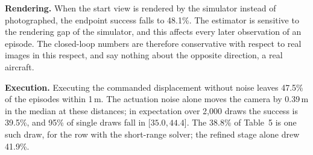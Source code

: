 \documentclass[10pt,twocolumn,letterpaper]{article}
\newcommand{\ci}[2]{{\scriptsize[\ensuremath{#1},\,\ensuremath{#2}]}}
\begin{document}
\noindent\textbf{Rendering.} When the start view is rendered by the simulator instead of photographed, the endpoint success falls to 48.1\%. The estimator is sensitive to the rendering gap of the simulator, and this affects every later observation of an episode. The closed-loop numbers are therefore conservative with respect to real images in this respect, and say nothing about the opposite direction, a real aircraft.

\noindent\textbf{Execution.} Executing the commanded displacement without noise leaves 47.5\% of the episodes within 1\,m. The actuation noise alone moves the camera by 0.39\,m in the median at these distances; in expectation over 2{,}000 draws the success is 39.5\%, and 95\% of single draws fall in \ci{35.0}{44.4}. The 38.8\% of Table~5 is one such draw, for the row with the short-range solver; the refined stage alone drew 41.9\%.

\begin{table}[t]
\centering
\caption{\textbf{Classical visual servoing in the simulator of Table~5} (same 160 episodes and actuation noise, one noise draw). SR: true position within 1\,m of the goal, after 1, 2, 5 steps and at the end of the step budget $T$. ``$>$50\,m'': episodes that move more than 50\,m away from the goal during the flight. Last two columns: steps flown and SR when the policy stops once its own estimate of the remaining distance is below 1\,m.}
\label{tab:servo}
\footnotesize
\setlength{\tabcolsep}{2.6pt}
\end{table}
\end{document}
